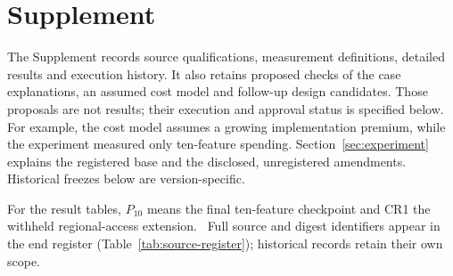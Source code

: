 \clearpage
\section{Supplement}\label{sec:supplement}

The Supplement records source qualifications, measurement definitions,
detailed results and execution history. It also retains proposed checks of
the case explanations, an assumed cost model and follow-up design candidates.
Those proposals are not results; their execution and approval status is
specified below. For example, the cost model assumes a growing implementation
premium, while the experiment measured only ten-feature spending.
Section~\ref{sec:experiment} explains the registered base and the disclosed,
unregistered amendments. Historical freezes below are version-specific.

For the result tables, $P_{10}$ means the final ten-feature checkpoint and
CR1 the withheld regional-access extension\@. \armlegend\ Full source and
digest identifiers appear in the end register
(Table~\ref{tab:source-register}); historical records retain their own scope.





